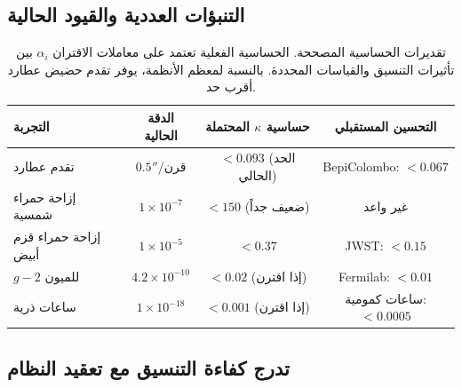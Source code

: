 \documentclass[11pt,a4paper]{article}
\begin{document}
	\subsection{التنبؤات العددية والقيود الحالية}
	
	\begin{table}[htbp]
		\centering
		\small
		\begin{english}
			\begin{tabular}{lccc}
				\toprule
				\textbf{التجربة} & \textbf{الدقة الحالية} & \textbf{حساسية $\kappa$ المحتملة} & \textbf{التحسين المستقبلي} \\
				\midrule
				تقدم عطارد & $0.5''$/قرن & $<0.093$ (الحد الحالي) & BepiColombo: $<0.067$ \\
				إزاحة حمراء شمسية & $1\times10^{-7}$ & $<150$ (ضعيف جداً) & غير واعد \\
				إزاحة حمراء قزم أبيض & $1\times10^{-5}$ & $<0.37$ & JWST: $<0.15$ \\
				$g-2$ للميون & $4.2\times10^{-10}$ & $<0.02$ (إذا اقترن) & Fermilab: $<0.01$ \\
				ساعات ذرية & $1\times10^{-18}$ & $<0.001$ (إذا اقترن) & ساعات كمومية: $<0.0005$ \\
				\bottomrule
			\end{tabular}
		\end{english}
		\caption{تقديرات الحساسية المصححة. الحساسية الفعلية تعتمد على معاملات الاقتران $\alpha_i$ بين تأثيرات التنسيق والقياسات المحددة. بالنسبة لمعظم الأنظمة، يوفر تقدم حضيض عطارد أقرب حد.}
	\end{table}
	
	\subsection{تدرج كفاءة التنسيق مع تعقيد النظام}
	
\end{document}
